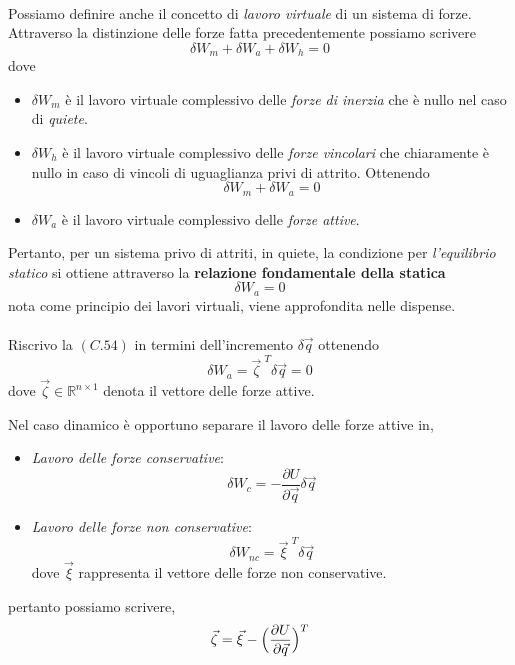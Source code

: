 \paragraph{}
Possiamo definire anche il concetto di \emph{lavoro virtuale} di un sistema di forze. Attraverso la distinzione delle forze fatta precedentemente possiamo scrivere 
\begin{equation}
	\delta W_m + \delta W_a + \delta W_h = 0
\end{equation}
dove 
\begin{itemize}
	\item $\delta W_m$ è il lavoro virtuale complessivo delle \emph{forze di inerzia} che è nullo nel caso di \emph{quiete}.
	\item $\delta W_h$ è il lavoro virtuale complessivo delle \emph{forze vincolari} che chiaramente è nullo in caso di vincoli di uguaglianza privi di attrito. Ottenendo
		\begin{equation}
			\delta W_m + \delta W_a = 0
		\end{equation}
	\item $\delta W_a$ è il lavoro virtuale complessivo delle \emph{forze attive}. 
\end{itemize}

Pertanto, per un sistema privo di attriti, in quiete, la condizione per \emph{l'equilibrio statico} si ottiene attraverso la \textbf{relazione fondamentale della statica} 
\begin{equation}
	\delta W_a = 0
\end{equation} 
nota come principio dei lavori virtuali, viene approfondita nelle dispense.

\paragraph{}
Riscrivo la $(C.54)$ in termini dell'incremento $\delta \vec{q}$ ottenendo
\begin{equation}
	\delta W_a = \vec{\zeta}^{\,\,T} \delta \vec{q} = 0
\end{equation}
dove $\vec{\zeta} \in \mathbb{R}^{n \times 1}$ denota il vettore delle forze attive.

Nel caso dinamico è opportuno separare il lavoro delle forze attive in,
\begin{itemize}
	\item \emph{Lavoro delle forze conservative}:
		\begin{equation}
			\delta W_{c} = - \frac{\partial U}{\partial \vec{q}} \delta \vec{q}
		\end{equation}
	\item \emph{Lavoro delle forze non conservative}:
		\begin{equation}
			\delta W_{nc} = \vec{\xi}^{\,\,T} \delta \vec{q}
		\end{equation}
		dove $\vec{\xi}$ rappresenta il vettore delle forze non conservative.
\end{itemize}
pertanto possiamo scrivere,
\begin{equation}
	\vec{\zeta} = \vec{\xi} - \Bigl( \frac{\partial U}{\partial \vec{q}} \Bigr)^T
\end{equation}

